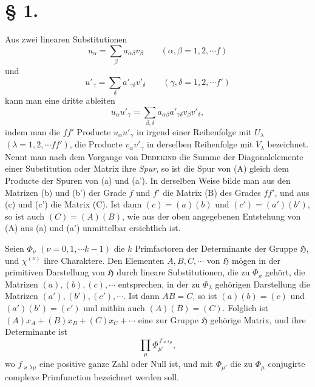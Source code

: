 \documentclass[11pt]{article}
\newcommand{\Hgr}{\mathfrak{H}}
\begin{document}
\section*{§ 1.}

Aus zwei linearen Substitutionen
\begin{equation*}\tag{a}
u_\alpha=\sum_\beta a_{\alpha\beta}v_\beta\qquad(\alpha,\beta=1,2,\cdots f)
\end{equation*}
und
\begin{equation*}\tag{a'}
u'_\gamma=\sum_\delta a'_{\gamma\delta}v'_\delta\qquad(\gamma,\delta=1,2,\cdots f')
\end{equation*}
kann man eine dritte ableiten
\begin{equation*}\tag{A}
u_\alpha u'_\gamma=\sum_{\beta,\delta}a_{\alpha\beta}a'_{\gamma\delta}v_\beta v'_\delta,
\end{equation*}
indem man die $ff'$ Producte $u_\alpha u'_\gamma$ in irgend einer Reihenfolge mit $U_\lambda$ $(\lambda=1,2,\cdots ff')$, die Producte $v_\alpha v'_\gamma$ in derselben Reihenfolge mit $V_\lambda$ bezeichnet. Nennt man nach dem Vorgange von \textsc{Dedekind} die Summe der Diagonalelemente einer Substitution oder Matrix ihre \emph{Spur}, so ist die Spur von (A) gleich dem Producte der Spuren von (a) und (a'). In derselben Weise bilde man aus den Matrizen (b) und (b') der Grade $f$ und $f'$ die Matrix (B) des Grades $ff'$, und aus (c) und (c') die Matrix (C). Ist dann $(c)=(a)(b)$ und $(c')=(a')(b')$, so ist auch $(C)=(A)(B)$, wie aus der oben angegebenen Entstehung von (A) aus (a) und (a') unmittelbar ersichtlich ist.

Seien $\Phi_\nu$ $(\nu=0,1,\cdots k-1)$ die $k$ Primfactoren der Determinante der Gruppe $\Hgr$, und $\chi^{(\nu)}$ ihre Charaktere. Den Elementen $A,B,C,\cdots$ von $\Hgr$ mögen in der primitiven Darstellung von $\Hgr$ durch lineare Substitutionen, die zu $\Phi_\varkappa$ gehört, die Matrizen $(a),(b),(c),\cdots$ entsprechen, in der zu $\Phi_\lambda$ gehörigen Darstellung die Matrizen $(a'),(b'),(c'),\cdots$. Ist dann $AB=C$, so ist $(a)(b)=(c)$ und $(a')(b')=(c')$ und mithin auch $(A)(B)=(C)$. Folglich ist $(A)x_A+(B)x_B+(C)x_C+\cdots$ eine zur Gruppe $\Hgr$ gehörige Matrix, und ihre Determinante ist
\begin{equation*}\tag{1.}
\prod_\mu \Phi_{\mu'}^{\,f_{\varkappa\lambda\mu}},
\end{equation*}
wo $f_{\varkappa\lambda\mu}$ eine positive ganze Zahl oder Null ist, und mit $\Phi_{\mu'}$ die zu $\Phi_\mu$ conjugirte complexe Primfunction bezeichnet werden soll.
\end{document}
